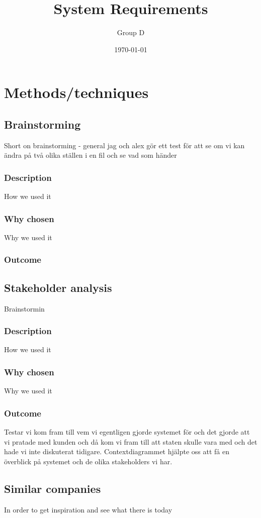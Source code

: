 \documentclass[a4paper]{article}
\title{System Requirements}
\author{Group D}
\date{\today}
\begin{document}
  \tableofcontents

  \section{Methods/techniques}
  \subsection{Brainstorming}
  Short on brainstorming - general
  jag och alex gör ett test för att se om vi kan ändra på två olika ställen i en fil och se vad som händer
    \subsubsection{Description}
    How we used it
    \subsubsection{Why chosen}
    Why we used it
    \subsubsection{Outcome}
    
    \subsection{Stakeholder analysis}
    Brainstormin
    \subsubsection{Description}
    How we used it
    \subsubsection{Why chosen}
    Why we used it
    \subsubsection{Outcome}
    Testar
    vi kom fram till vem vi egentligen gjorde systemet för och det gjorde att vi pratade med kunden och då kom vi fram till att staten skulle vara med och det hade vi inte diskuterat tidigare. 
Contextdiagrammet hjälpte oss att få en överblick på systemet och de olika stakeholders vi har.
    
    \subsection{Similar companies}
    In order to get inspiration and see what there is today
	
\end{document}
